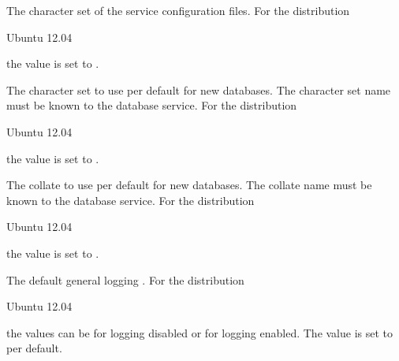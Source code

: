 The character set  of the service configuration files. 
For the distribution
\begin{inparaitem}
\item[\TheDistribution{ubuntu}] Ubuntu 12.04
\end{inparaitem}
the value is set to .


The character set  to use per default for new databases.
The character set name must be known to the database service.
For the distribution
\begin{inparaitem}
\item[\TheDistribution{ubuntu}] Ubuntu 12.04
\end{inparaitem}
the value is set to .


The collate  to use per default for new databases.
The collate name must be known to the database service.
For the distribution
\begin{inparaitem}
\item[\TheDistribution{ubuntu}] Ubuntu 12.04
\end{inparaitem}
the value is set to .
 

The default general logging .
For the distribution
\begin{inparaitem}
\item[\TheDistribution{ubuntu}] Ubuntu 12.04
\end{inparaitem}
the values can be  for logging disabled or  for logging 
enabled. The value is set to  per default.


